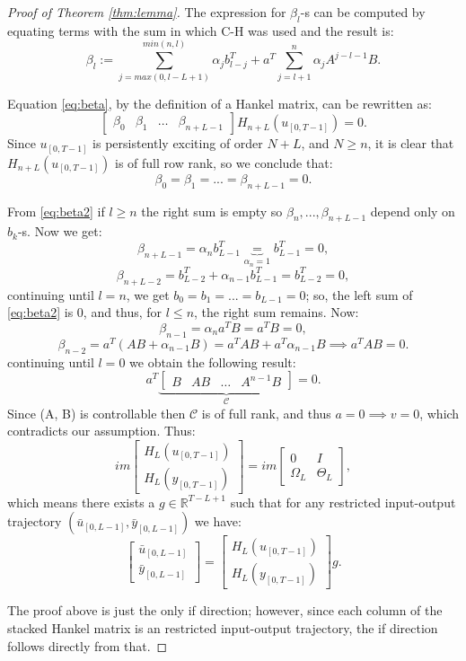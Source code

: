 \documentclass[12pt,a4paper]{report}
\begin{document}
\begin{proof}[Proof of Theorem \ref{thm:lemma}]
    The expression for $\beta_l$-s can be computed by equating terms with the sum in which C-H was used and the result is:
    \begin{equation}
        \beta_l := \sum_{j = max(0, l-L+1)}^{min(n, l)}\alpha_{j}b_{l-j}^T + a^T\sum_{j = l+1}^{n}\alpha_{j}A^{j-l-1}B.
        \label{eq:beta2}
    \end{equation}


    Equation \eqref{eq:beta}, by the definition of a Hankel matrix, can be rewritten as:
    \[\begin{bmatrix} \beta_0 & \beta_1 & \dots & \beta_{n+L-1}\end{bmatrix}H_{n+L}(u_{[0, T-1]}) = 0.\]
    Since $u_{[0, T-1]}$ is persistently exciting of order $N+L$, and $N \geq n$, it is clear that $H_{n+L}(u_{[0, T-1]})$ is of full row rank, so we conclude that:
    \[\beta_0 = \beta_1 = ... = \beta_{n+L-1} = 0 .\]

    From \eqref{eq:beta2} if $l\geq n$ the right sum is empty so \(\beta_n, ..., \beta_{n+L-1}\) depend only on $b_k$-s. Now we get:
    \[\beta_{n+L-1} = \alpha_{n}b_{L-1}^T \underbrace{=}_\text{$\alpha_n = 1$} b_{L-1}^T = 0, \]
    \[\beta_{n+L-2} = b_{L-2}^T + \alpha_{n-1}b_{L-1}^T = b_{L-2}^T = 0, \]
    continuing until $l = n$, we get \(b_0 = b_1 = ... = b_{L-1} = 0\); so, the left sum of \eqref{eq:beta2} is 0, and thus, for $l \leq n$, the right sum remains. Now:
    \[\beta_{n-1} = \alpha_{n}a^{T}B = a^{T}B = 0,\]
    \[\beta_{n-2} = a^{T}(AB + \alpha_{n-1}B) = a^{T}AB + a^{T}\alpha_{n-1}B \implies a^{T}AB = 0.\]
    continuing until $l = 0$ we obtain the following result:
    \[a^{T}\underbrace{\begin{bmatrix} B & AB & \dots & A^{n-1}B \end{bmatrix}}_\text{$\mathcal{C}$} = 0.\]
    Since (A, B) is controllable then $\mathcal{C}$ is of full rank, and thus \(a = 0 \implies v = 0\), which contradicts our assumption. Thus:
    \[im\begin{bmatrix} H_{L}(u_{[0, T-1]})\\ H_{L}(y_{[0, T-1]})\end{bmatrix} = im\begin{bmatrix}0 & I \\ \Omega_L & \Theta_L \end{bmatrix},\]
    which means there exists a $g\in\mathbb{R}^{T-L+1}$ such that for any restricted input-output trajectory \((\bar{u}_{[0, L-1]}, \bar{y}_{[0, L-1]})\) we have:
    \[\begin{bmatrix} \bar{u}_{[0, L-1]} \\ \bar{y}_{[0, L-1]} \end{bmatrix} = \begin{bmatrix} H_{L}(u_{[0, T-1]}) \\ H_{L}(y_{[0, T-1]})\end{bmatrix}g. \]

    The proof above is just the only if direction; however, since each column of the stacked Hankel matrix is an restricted input-output trajectory, the
    if direction follows directly from that.

\end{proof}
\end{document}
